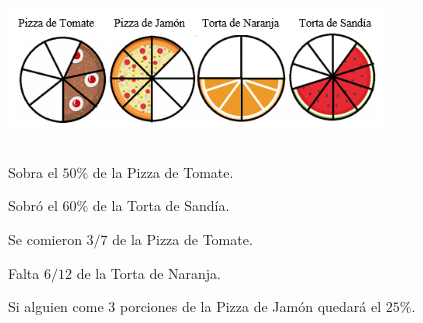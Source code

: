 \documentclass[11pt]{examdesign}
\begin{document}
    \begin{truefalse}[title={\textcolor{upforestgreen}{\textbf{Parte $3$.}}	Observa las imágenes, calcula si es necesario y coloca Verdadero ó Falso según corresponda},
    	resetcounter=no,suppressprefix]
        \begin{center}
        	\includegraphics[width=10cm, height=4cm]{pizzas.png}
        \end{center}
    	\begin{question}
    		 Sobra el $50\%$ de la Pizza de Tomate.
    	\end{question}
    	
    	\begin{question}
    		  Sobró el $60\%$ de la Torta de Sandía.
    	\end{question}
    	
    	\begin{question}
    		 Se comieron 3$/7$ de la Pizza de Tomate.
    	\end{question}
        
        \begin{question}
        	 Falta $6/12$ de la Torta de Naranja.
        \end{question}
        \begin{question}
        	 Si alguien come 3 porciones de la Pizza de Jamón quedará el $25\%$.
        \end{question}
    	
    \end{truefalse}
    
    
\end{document}
